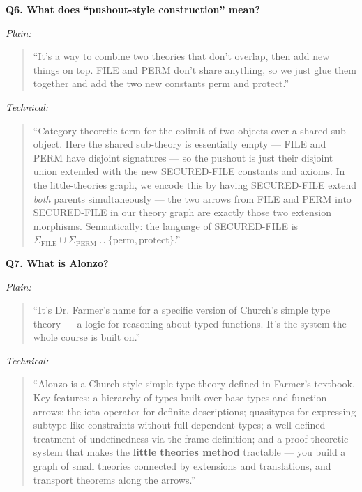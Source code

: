 \documentclass[12pt]{article}
\newenvironment{say}{%
  \par\medskip%
  \begin{quote}%
  \setlength{\parskip}{0.7em}%
  \large\itshape%
}{%
  \end{quote}%
  \medskip%
}
\begin{document}
\vspace{0.8em}
\textbf{\color{slidebar}Q6. What does ``pushout-style construction'' mean?}

\textit{\color{pauseclr}Plain:}
\begin{say}
``It's a way to combine two theories that don't overlap, then add new things on top. FILE and PERM don't share anything, so we just glue them together and add the two new constants $\mathrm{perm}$ and $\mathrm{protect}$.''
\end{say}

\textit{\color{pauseclr}Technical:}
\begin{say}
``Category-theoretic term for the colimit of two objects over a shared sub-object. Here the shared sub-theory is essentially empty --- FILE and PERM have disjoint signatures --- so the pushout is just their disjoint union extended with the new SECURED-FILE constants and axioms. In the little-theories graph, we encode this by having SECURED-FILE extend \emph{both} parents simultaneously --- the two arrows from FILE and PERM into SECURED-FILE in our theory graph are exactly those two extension morphisms. Semantically: the language of SECURED-FILE is $\Sigma_{\mathrm{FILE}} \cup \Sigma_{\mathrm{PERM}} \cup \{\mathrm{perm}, \mathrm{protect}\}$.''
\end{say}

\vspace{0.8em}
\textbf{\color{slidebar}Q7. What is Alonzo?}

\textit{\color{pauseclr}Plain:}
\begin{say}
``It's Dr. Farmer's name for a specific version of Church's simple type theory --- a logic for reasoning about typed functions. It's the system the whole course is built on.''
\end{say}

\textit{\color{pauseclr}Technical:}
\begin{say}
``Alonzo is a Church-style simple type theory defined in Farmer's textbook. Key features: a hierarchy of types built over base types and function arrows; the iota-operator for definite descriptions; quasitypes for expressing subtype-like constraints without full dependent types; a well-defined treatment of undefinedness via the frame definition; and a proof-theoretic system that makes the \textbf{little theories method} tractable --- you build a graph of small theories connected by extensions and translations, and transport theorems along the arrows.''
\end{say}
\end{document}
